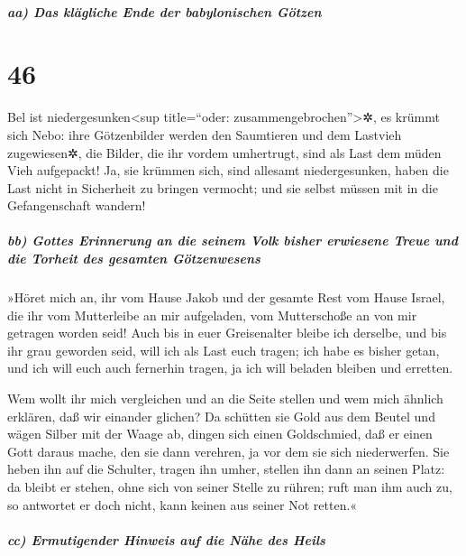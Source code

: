 \hypertarget{aa-das-kluxe4gliche-ende-der-babylonischen-guxf6tzen}{%
\subparagraph{aa) Das klägliche Ende der babylonischen
Götzen}\label{aa-das-kluxe4gliche-ende-der-babylonischen-guxf6tzen}}

\hypertarget{section-45}{%
\section{46}\label{section-45}}

Bel ist niedergesunken\textless sup title=``oder:
zusammengebrochen''\textgreater✲, es krümmt sich Nebo: ihre Götzenbilder
werden den Saumtieren und dem Lastvieh zugewiesen✲, die Bilder, die ihr
vordem umhertrugt, sind als Last dem müden Vieh aufgepackt!
Ja, sie krümmen sich, sind allesamt niedergesunken, haben
die Last nicht in Sicherheit zu bringen vermocht; und sie selbst müssen
mit in die Gefangenschaft wandern!

\hypertarget{bb-gottes-erinnerung-an-die-seinem-volk-bisher-erwiesene-treue-und-die-torheit-des-gesamten-guxf6tzenwesens}{%
\subparagraph{bb) Gottes Erinnerung an die seinem Volk bisher erwiesene
Treue und die Torheit des gesamten
Götzenwesens}\label{bb-gottes-erinnerung-an-die-seinem-volk-bisher-erwiesene-treue-und-die-torheit-des-gesamten-guxf6tzenwesens}}

»Höret mich an, ihr vom Hause Jakob und der gesamte Rest
vom Hause Israel, die ihr vom Mutterleibe an mir aufgeladen, vom
Mutterschoße an von mir getragen worden seid! Auch bis in
euer Greisenalter bleibe ich derselbe, und bis ihr grau geworden seid,
will ich als Last euch tragen; ich habe es bisher getan, und ich will
euch auch fernerhin tragen, ja ich will beladen bleiben und erretten.

Wem wollt ihr mich vergleichen und an die Seite stellen
und wem mich ähnlich erklären, daß wir einander glichen?
Da schütten sie Gold aus dem Beutel und wägen Silber mit
der Waage ab, dingen sich einen Goldschmied, daß er einen Gott daraus
mache, den sie dann verehren, ja vor dem sie sich niederwerfen.
Sie heben ihn auf die Schulter, tragen ihn umher, stellen
ihn dann an seinen Platz: da bleibt er stehen, ohne sich von seiner
Stelle zu rühren; ruft man ihm auch zu, so antwortet er doch nicht, kann
keinen aus seiner Not retten.«

\hypertarget{cc-ermutigender-hinweis-auf-die-nuxe4he-des-heils}{%
\subparagraph{cc) Ermutigender Hinweis auf die Nähe des
Heils}\label{cc-ermutigender-hinweis-auf-die-nuxe4he-des-heils}}

